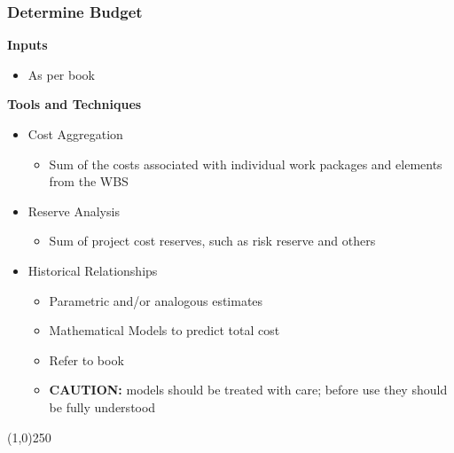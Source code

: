 \begin{frame}
\frametitle{Determine Budget}
\textbf{Inputs}
\begin{itemize}
	\item As per book
\end{itemize}
\textbf{Tools and Techniques}
\begin{itemize}
	\item Cost Aggregation
	\begin{itemize}
		\item Sum of the costs associated with individual work packages and elements from the WBS
	\end{itemize}
	\item Reserve Analysis
	\begin{itemize}
		\item Sum of project cost reserves, such as risk reserve and others
	\end{itemize}
	\item Historical Relationships
	\begin{itemize}
		\item Parametric and/or analogous estimates
		\item Mathematical Models to predict total cost
		\item Refer to book 
		\item\textbf{CAUTION:} models should be treated with care; before use they should be fully understood
	\end{itemize}
\end{itemize}
\end{frame}
\begin{center}\line(1,0){250}\end{center}






